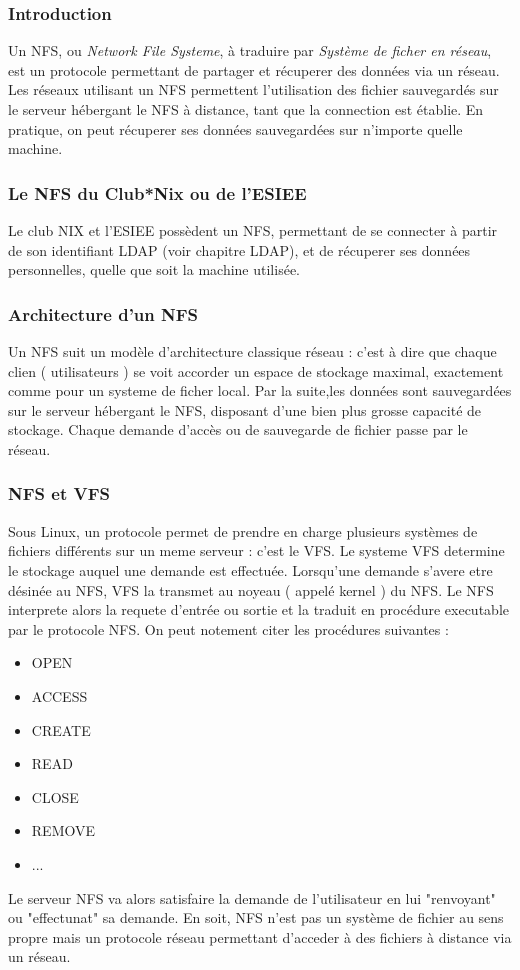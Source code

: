 \subsubsection{Introduction}

Un NFS, ou \textit{Network File Systeme}, à traduire par \textit{Système de ficher en réseau}, est un protocole permettant de partager et récuperer des données via un réseau. Les réseaux utilisant un NFS permettent l'utilisation des fichier sauvegardés sur le serveur hébergant le NFS à distance, tant que la connection est établie. En pratique, on peut récuperer ses données sauvegardées sur n'importe quelle machine.


\subsubsection{Le NFS du Club*Nix ou de l'ESIEE}

Le club NIX et l'ESIEE possèdent un NFS, permettant de se connecter à partir de son identifiant LDAP (voir chapitre LDAP), et de récuperer ses données personnelles, quelle que soit la machine utilisée.
\subsubsection{Architecture d'un NFS}
Un NFS suit un modèle d'architecture classique réseau : c'est à dire que chaque clien ( utilisateurs ) se voit accorder un espace de stockage maximal, exactement comme pour un systeme de ficher local. Par la suite,les données sont sauvegardées sur le serveur hébergant le NFS, disposant d'une bien plus grosse capacité de stockage. Chaque demande d'accès ou de sauvegarde de fichier passe par le réseau.


\subsubsection{NFS et VFS}
Sous Linux, un protocole permet de prendre en charge plusieurs systèmes de fichiers différents sur un meme serveur : c'est le VFS. Le systeme VFS determine le stockage auquel une demande est effectuée.
Lorsqu'une demande s'avere etre désinée au NFS, VFS la transmet au noyeau ( appelé kernel ) du NFS. Le NFS interprete alors la requete d'entrée ou sortie et la traduit en procédure executable par le protocole NFS. On peut notement citer les procédures suivantes :
\begin{itemize}
  \item OPEN
  \item ACCESS
  \item CREATE
  \item READ
  \item CLOSE
  \item REMOVE
  \item ...
\end{itemize}
Le serveur NFS va alors satisfaire la demande de l'utilisateur en lui "renvoyant" ou "effectunat" sa demande.
En soit, NFS n'est pas un système de fichier au sens propre mais un protocole réseau permettant d'acceder à des fichiers à distance via un réseau.


